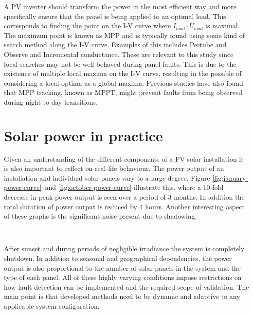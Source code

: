 A PV inverter should transform the power in the most efficient way and more specifically ensure that the panel is being applied to an optimal load.
This corresponds to finding the point on the I-V curve where $I_{load} \cdot U_{load}$ is maximal.
The maximum point is known as MPP and is typically found using some kind of search method along the I-V curve.
Examples of this includes Pertube and Observe and Incremental conductance\cite{Roman2006}.
These are relevant to this study since local searches may not be well-behaved during panel faults\cite{Roman2006}.
This is due to the existence of multiple local maxima on the I-V curve, resulting in the possible of considering a local optima as a global maxima.
Previous studies have also found that MPP tracking, known as MPPT, might prevent faults from being observed during night-to-day transitions\cite{Zhao2010night}.


\section{Solar power in practice}
Given an understanding of the different components of a PV solar installation it is also important to reflect on real-life behaviour.
The power output of an installation and individual solar panels vary to a large degree.
Figure \ref{fig:january-power-curve} and \ref{fig:october-power-curve} illustrate this, where a 10-fold decrease in peak power output is seen over a period of 3 months.
In addition the total duration of power output is reduced by 4 hours.
Another interesting aspect of these graphs is the significant noise present due to shadowing.

\begin{figure}[here]
\centering
{}
~
\end{figure}

After sunset and during periods of negligible irradiance the system is completely shutdown.
In addition to seasonal and geographical dependencies, the power output is also proportional to the number of solar panels in the system and the type of each panel.
All of these highly varying conditions impose restrictions on how fault detection can be implemented and the required scope of validation.
The main point is that developed methods need to be dynamic and adaptive to any applicable system configuration.


